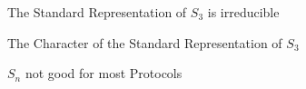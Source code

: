 \begin{frame}{The Standard Representation of $S_3$ is irreducible}
    
\end{frame}

\begin{frame}{The Character of the Standard Representation of $S_3$}
    
\end{frame}

\begin{frame}{$S_n$ not good for most Protocols}
\end{frame}
